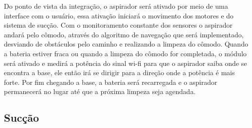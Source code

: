     	Do ponto de vista da integração, o aspirador será ativado por meio de uma interface com o usuário, essa ativação iniciará o movimento dos motores e do sistema de sucção. Com o monitoramento constante dos sensores o aspirador andará pelo cômodo, através do algoritmo de navegação que será implementado, desviando de obstáculos pelo caminho e realizando a limpeza do cômodo. Quando a bateria estiver fraca ou quando a limpeza do cômodo for completada, o módulo será ativado e medirá a potência do sinal wi-fi para que o aspirador saiba onde se encontra a base, ele então irá se dirigir para a direção onde a potência é mais forte. Por fim chegando a base, a bateria será recarregada e o aspirador permanecerá no lugar até que a próxima limpeza seja agendada.  

	\subsection{Sucção}
	\label{sub:plano_sucção}


